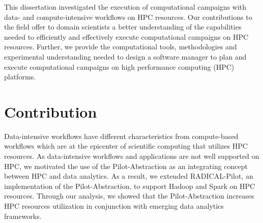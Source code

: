 \label{ch:conclusions}

This dissertation investigated the execution of computational campaigns with
data- and compute-intensive workflows on HPC resources. Our contributions to the
field offer to domain scientists a better understanding of the capabilities
needed to efficiently and effectively execute computational campaigns on HPC
resources. Further, we provide the computational tools, methodologies and
experimental understanding needed to design a software manager to plan and
execute computational campaigns on high performance computing (HPC) platforms.

\section{Contribution}

Data-intensive workflows have different characteristics from compute-based
workflows which are at the epicenter of scientific computing that utilizes HPC
resources. As
data-intensive workflows and applications are not well supported on HPC, we
motivated the use of the Pilot-Abstraction as an integrating concept between HPC
and data analytics. As a result, we extended RADICAL-Pilot, an implementation of
the Pilot-Abstraction, to support Hadoop and Spark on HPC resources. Through our
analysis, we showed that the Pilot-Abstraction increases HPC resources
utilization in conjunction with emerging data analytics frameworks.

